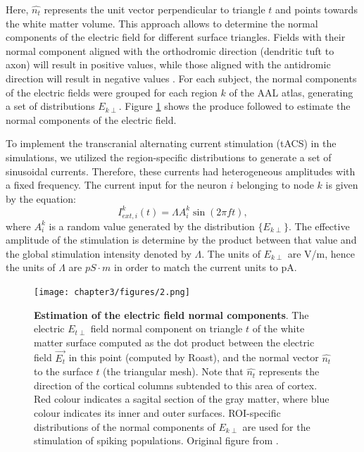 \documentclass[../main.tex]{subfiles}
\begin{document}
Here, $\hat{n_t}$ represents the unit vector perpendicular to triangle $t$ and points towards the white matter volume.
This approach allows to determine the normal components of the electric field for different surface triangles.
Fields with their normal component aligned with the orthodromic direction (dendritic tuft to axon) will result in positive values, while those aligned with the antidromic direction will result in negative values \citep{bikson2004effects,merlet_oscillatory_2013}.
For each subject, the normal components of the electric fields were grouped for each region $k$ of the  AAL atlas, generating a set of distributions $E_{k\perp}$.
Figure \ref{fig:fig2} shows the produce followed to estimate the normal components of the electric field.

To implement the transcranial alternating current stimulation (tACS) in the simulations, we utilized the region-specific distributions to generate a set of sinusoidal currents.
Therefore, these currents had heterogeneous amplitudes with a fixed frequency.
The current input for the neuron $i$ belonging to node $k$ is given by the equation:
\begin{equation}
    I_{ext,i}^k(t) = \Lambda A_i^k  \sin{(2 \pi f t)},
    \label{eq:tacs}
\end{equation}
where $A_i^k$ is a random value generated by the distribution $\{E_{k\perp}\}$.
The effective amplitude of the stimulation is determine by the product between that value and the global stimulation intensity denoted by $\Lambda$.
The units of ${E_{k\perp}}$ are V/m, hence the units of $\Lambda$ are $pS\cdot m$ in order to match the current units to pA.
\begin{figure}[!htb]
\centering
\texttt{[image: chapter3/figures/2.png]}
 \caption{\textbf{Estimation of the electric field normal components}.
 The electric $E_{t\perp}$ field normal component on triangle $t$ of the white matter surface computed as the dot product between the electric field $\vec{E_t}$ in this point (computed by Roast), and the normal vector $\hat{n_t}$ to the surface $t$ (the triangular mesh).
 Note that $\hat{n_t}$ represents the direction of the cortical columns subtended to this area of cortex.
 Red colour indicates a sagital section of the gray matter, where blue colour indicates its inner and outer surfaces.
 ROI-specific distributions of the normal components of $E_{k\perp}$ are used for the stimulation of spiking populations.
 Original figure from \citep{cabrera-alvarez_understanding_2023}.}
\label{fig:fig2}
\end{figure}
\end{document}
